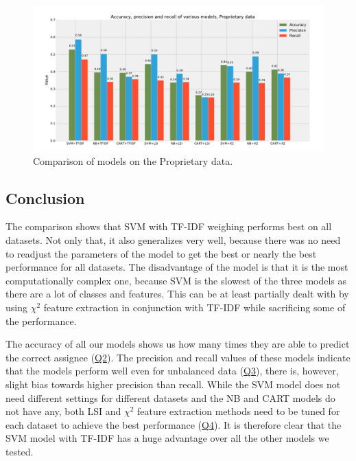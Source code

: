 \begin{figure}[htbp]
    \centering
        \includegraphics[width=\textwidth]{./images/comparison_of_models/proprietary.pdf}
    \caption{Comparison of models on the Proprietary data.}
    \label{fig:results.models.proprietary}
\end{figure}

\subsection{Conclusion}

The comparison shows that SVM with TF-IDF weighing performs best on all datasets. Not only that, it also generalizes very well, because there was no need to readjust the parameters of the model to get the best or nearly the best performance for all datasets. The disadvantage of the model is that it is the most computationally complex one, because SVM is the slowest of the three models as there are a lot of classes and  features. This can be at least partially dealt with by using $\chi^2$ feature extraction in conjunction with TF-IDF while sacrificing some of the performance.

The accuracy of all our models shows us how many times they are able to predict the correct assignee (\hyperlink{question:2}{Q2}). The precision and recall values of these models indicate that the models perform well even for unbalanced data (\hyperlink{question:3}{Q3}), there is, however, slight bias towards higher precision than recall. While the SVM model does not need different settings for different datasets and the NB and CART models do not have any, both LSI and $\chi^2$ feature extraction methods need to be tuned for each dataset to achieve the best performance (\hyperlink{question:4}{Q4}). It is therefore clear that the SVM model with TF-IDF has a huge advantage over all the other models we tested.


